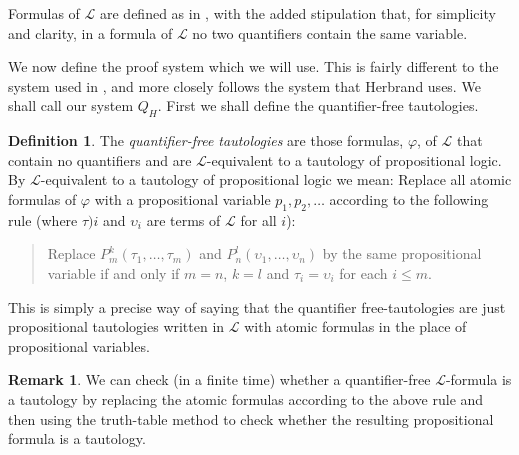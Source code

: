 \documentclass[a4paper,12pt]{report}
\theoremstyle{definition}
\newtheorem{mydef}[lem]{Definition}
\newtheorem{remark}[lem]{Remark}
\begin{document}
Formulas of $\mathcal{L}$ are defined as in \cite{logic10}, with the added stipulation that, for simplicity and clarity, in a formula of $\mathcal{L}$ no two quantifiers contain the same variable.

We now define the proof system which we will use. This is fairly different to the system used in \cite{logic10}, and more closely follows the system that Herbrand uses. We shall call our system $Q_H$. First we shall define the quantifier-free tautologies.

\begin{mydef}
The \emph{quantifier-free tautologies} are those formulas, $\varphi$, of $\mathcal{L}$ that contain no quantifiers and are $\mathcal{L}$-equivalent to a tautology of propositional logic. By $\mathcal{L}$-equivalent to a tautology of propositional logic we mean: Replace all atomic formulas of $\varphi$ with a propositional variable $p_1, p_2, \ldots $ according to the following rule (where $\tau)i$ and $\upsilon_i$ are terms of $\mathcal{L}$ for all $i$):
\begin{quote}
{Replace $P_m^k(\tau_1, \ldots, \tau_m)$ and $P_n^l(\upsilon_1, \ldots, \upsilon_n)$ by the same propositional variable if and only if $m = n$, $k = l$ and $\tau_i = \upsilon_i$ for each $i \le m$.}
\end{quote}
\end{mydef}

\noindent This is simply a precise way of saying that the quantifier free-tautologies are just propositional tautologies written in $\mathcal{L}$ with atomic formulas in the place of propositional variables. 

\begin{remark}
\label{truth-tables}
We can check (in a finite time) whether a quantifier-free $\mathcal{L}$-formula is a tautology by replacing the atomic formulas according to the above rule and then using the truth-table method to check whether the resulting propositional formula is a tautology.
\end{remark}
\end{document}
